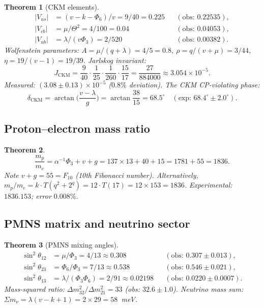 \documentclass[12pt,a4paper]{article}
\newtheorem{theorem}{Theorem}[section]
\theoremstyle{definition}
\newcommand{\Phithree}{\Phi_3}
\newcommand{\Phisix}{\Phi_6}
\begin{document}
\begin{theorem}[CKM elements]
\begin{align}
  |V_{us}| &= (v-k-\Phisix)/v = 9/40 = 0.225 &&(\text{obs: }0.22535),\\
  |V_{cb}| &= \mu/\Theta^2 = 4/100 = 0.04    &&(\text{obs: }0.04053),\\
  |V_{ub}| &= \lambda/(v\Phithree) = 2/520   &&(\text{obs: }0.00382).
\end{align}
Wolfenstein parameters: $A=\mu/(q+\lambda)=4/5=0.8$,
$\rho=q/(v+\mu)=3/44$, $\eta=19/(v-1)=19/39$.
Jarlskog invariant:
\begin{equation}
  J_{\mathrm{CKM}} = \frac{9}{40}\cdot\frac{1}{25}\cdot\frac{1}{260}
    \cdot\frac{15}{17} = \frac{27}{884000} \approx 3.054\times 10^{-5}.
\end{equation}
Measured: $(3.08\pm 0.13)\times 10^{-5}$ ($0.8\%$ deviation).
The CKM CP-violating phase:
\begin{equation}
  \delta_{\mathrm{CKM}} = \arctan\!\biggl(\frac{v-\lambda}{g}\biggr)
  = \arctan\!\frac{38}{15} = 68.5^\circ
  \quad(\text{exp: }68.4^\circ\pm 2.0^\circ).
\end{equation}
\end{theorem}

\subsection{Proton--electron mass ratio}

\begin{theorem}
\begin{equation}
  \frac{m_p}{m_e} = \alpha^{-1}\Phithree + v + g
  = 137\times 13 + 40 + 15 = 1781 + 55 = 1836.
\end{equation}
Note $v+g=55=F_{10}$ (10th Fibonacci number).
Alternatively, $m_p/m_e = k\cdot T(q^2+2^q) = 12\cdot T(17) = 12\times 153 = 1836$.
Experimental: $1836.153$; error $0.008\%$.
\end{theorem}

\subsection{PMNS matrix and neutrino sector}

\begin{theorem}[PMNS mixing angles]
\begin{align}
  \sin^2\theta_{12} &= \mu/\Phithree = 4/13 \approx 0.308
    &&(\text{obs: }0.307\pm 0.013),\\
  \sin^2\theta_{23} &= \Phisix/\Phithree = 7/13 \approx 0.538
    &&(\text{obs: }0.546\pm 0.021),\\
  \sin^2\theta_{13} &= \lambda/(\Phithree\Phisix) = 2/91 \approx 0.02198
    &&(\text{obs: }0.0220\pm 0.0007).
\end{align}
Mass-squared ratio: $\Delta m^2_{32}/\Delta m^2_{21}=33$ (obs: $32.6\pm 1.0$).
Neutrino mass sum: $\Sigma m_\nu = \lambda(v-k+1) = 2\times 29 = 58$~meV.
\end{theorem}
\end{document}
